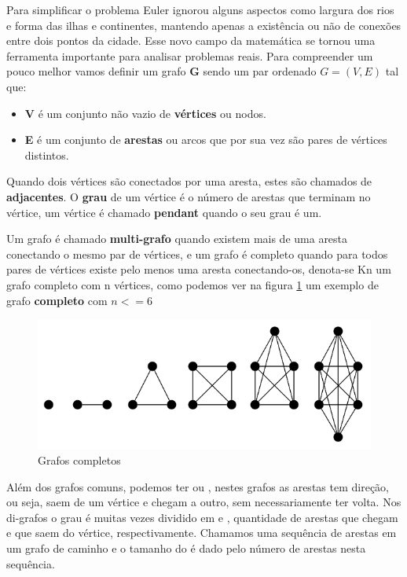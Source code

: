 \documentclass[a4paper]{abnt}
\begin{document}
Para simplificar o problema Euler ignorou alguns aspectos como largura dos rios e forma das ilhas e continentes, mantendo apenas a existência ou não de conexões entre dois pontos da cidade. Esse novo campo da matemática se tornou uma ferramenta importante para analisar problemas reais. Para compreender um pouco melhor vamos definir um grafo \textbf{G} sendo um par ordenado \textbf{$G = (V, E)$} tal que:

\begin{itemize}
    \item \textbf{V} é um conjunto não vazio de \textbf{vértices} ou nodos.
    \item \textbf{E} é um conjunto de \textbf{arestas} ou arcos que por sua vez são pares de vértices distintos.
\end{itemize}

Quando dois vértices são conectados por uma aresta, estes são chamados de \textbf{adjacentes}. O \textbf{grau} de um vértice é o número de arestas que terminam no vértice, um vértice é chamado \textbf{pendant} quando o seu grau é um.

Um grafo é chamado \textbf{multi-grafo} quando existem mais de uma aresta conectando o mesmo par de vértices, e um grafo é completo quando para todos pares de vértices existe pelo menos uma aresta conectando-os, denota-se Kn um grafo completo com n vértices, como podemos ver na figura \ref{img_complete_graphs} um exemplo de grafo \textbf{completo} com $n <= 6$

\begin{figure}[htb]
    \centering
	\includegraphics[width=12cm]{complete_graphs.png}
	\caption{Grafos completos}
	\label{img_complete_graphs}
\end{figure}

Além dos grafos comuns, podemos ter  ou , nestes grafos as arestas tem direção, ou seja, saem de um vértice e chegam a outro, sem necessariamente ter volta. Nos di-grafos o grau é muitas vezes dividido em  e , quantidade de arestas que chegam e que saem do vértice, respectivamente. Chamamos uma sequência de arestas em um grafo de caminho e o tamanho do  é dado pelo número de arestas nesta sequência.
\end{document}
